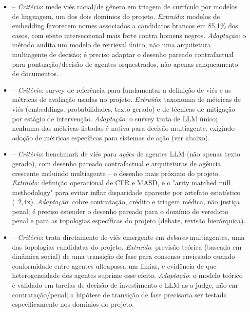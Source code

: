 \documentclass[12pt]{article}
\begin{document}
\begin{itemize}
    \item \textbf{\citet{wilson2024gender}} -- \textit{Critério}: mede viés racial/de gênero em triagem de currículo por modelos de linguagem, um dos dois domínios do projeto. \textit{Extraído}: modelos de embedding favorecem nomes associados a candidatos brancos em 85,1\% dos casos, com efeito interseccional mais forte contra homens negros. \textit{Adaptação}: o método audita um modelo de retrieval único, não uma arquitetura multiagente de decisão; é preciso adaptar o desenho pareado contrafactual para pontuação/decisão de agentes orquestrados, não apenas ranqueamento de documentos.

    \item \textbf{\citet{gallegos2024bias}} -- \textit{Critério}: survey de referência para fundamentar a definição de viés e as métricas de avaliação usadas no projeto. \textit{Extraído}: taxonomia de métricas de viés (embeddings, probabilidades, texto gerado) e de técnicas de mitigação por estágio de intervenção. \textit{Adaptação}: o survey trata de LLM único; nenhuma das métricas listadas é nativa para decisão multiagente, exigindo adoção de métricas específicas para sistemas de ação (ver \citet{morla2026agentfairbench} abaixo).

    \item \textbf{\citet{morla2026agentfairbench}} -- \textit{Critério}: benchmark de viés para \emph{ações} de agentes LLM (não apenas texto gerado), com desenho pareado contrafactual e arquiteturas de agência crescente incluindo multiagente -- o desenho mais próximo do projeto. \textit{Extraído}: definição operacional de CFR e MASD, e o "arity matched null methodology" para evitar inflar disparidade aparente por artefato estatístico (~2,4x). \textit{Adaptação}: cobre contratação, crédito e triagem médica, não justiça penal; é preciso estender o desenho pareado para o domínio de veredicto penal e para as topologias específicas do projeto (debate, revisão hierárquica).

    \item \textbf{\citet{okawa2026emergence}} -- \textit{Critério}: trata diretamente de viés emergente em \emph{debates} multiagentes, uma das topologias candidatas do projeto. \textit{Extraído}: previsão teórica (baseada em dinâmica social) de uma transição de fase para consenso enviesado quando conformidade entre agentes ultrapassa um limiar, e evidência de que heterogeneidade dos agentes suprime esse efeito. \textit{Adaptação}: o modelo teórico é validado em tarefas de decisão de investimento e LLM-as-a-judge, não em contratação/penal; a hipótese de transição de fase precisaria ser testada especificamente nos domínios do projeto.


\end{itemize}
\end{document}
